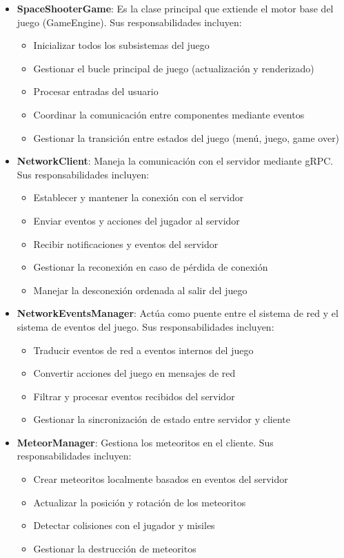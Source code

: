 \documentclass[12pt,letterpaper]{article}
\begin{document}
\begin{itemize}
    \item \textbf{SpaceShooterGame}: Es la clase principal que extiende el motor base del juego (GameEngine). Sus responsabilidades incluyen:
    \begin{itemize}
        \item Inicializar todos los subsistemas del juego
        \item Gestionar el bucle principal de juego (actualización y renderizado)
        \item Procesar entradas del usuario
        \item Coordinar la comunicación entre componentes mediante eventos
        \item Gestionar la transición entre estados del juego (menú, juego, game over)
    \end{itemize}
    
    \item \textbf{NetworkClient}: Maneja la comunicación con el servidor mediante gRPC. Sus responsabilidades incluyen:
    \begin{itemize}
        \item Establecer y mantener la conexión con el servidor
        \item Enviar eventos y acciones del jugador al servidor
        \item Recibir notificaciones y eventos del servidor
        \item Gestionar la reconexión en caso de pérdida de conexión
        \item Manejar la desconexión ordenada al salir del juego
    \end{itemize}
    
    \item \textbf{NetworkEventsManager}: Actúa como puente entre el sistema de red y el sistema de eventos del juego. Sus responsabilidades incluyen:
    \begin{itemize}
        \item Traducir eventos de red a eventos internos del juego
        \item Convertir acciones del juego en mensajes de red
        \item Filtrar y procesar eventos recibidos del servidor
        \item Gestionar la sincronización de estado entre servidor y cliente
    \end{itemize}
    
    \item \textbf{MeteorManager}: Gestiona los meteoritos en el cliente. Sus responsabilidades incluyen:
    \begin{itemize}
        \item Crear meteoritos localmente basados en eventos del servidor
        \item Actualizar la posición y rotación de los meteoritos
        \item Detectar colisiones con el jugador y misiles
        \item Gestionar la destrucción de meteoritos
    \end{itemize}
    

\end{itemize}
\end{document}

